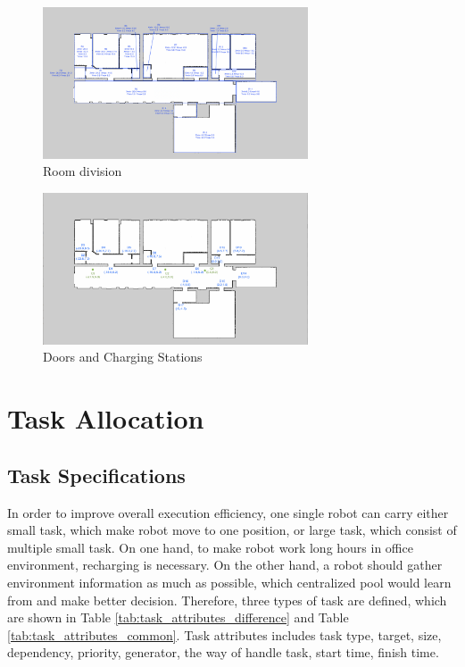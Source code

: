 \begin{figure}[htbp]
	\centering
	\includegraphics[width = 0.7\textwidth]{content/images/ch3/room_division.png}
	\caption{Room division}
	\label{fig:room_division}
\end{figure}

\begin{figure}[htbp]
	\centering
	\includegraphics[width = 0.7\textwidth]{content/images/ch3/positions_door_station.png}
	\caption{Doors and Charging Stations}
	\label{fig:positions_door_station}
\end{figure}

\section{Task Allocation}

\subsection{Task Specifications}
\label{sec:task_specifications}
In order to improve overall execution efficiency, one single robot can carry either small task, which make robot move to one position, or large task, which consist of multiple small task.
On one hand, to make robot work long hours in office environment, recharging is necessary. On the other hand, a robot should gather environment information as much as possible, which centralized pool would learn from and make better decision. 
Therefore, three types of task are defined, which are shown in Table \ref{tab:task_attributes_difference} and Table \ref{tab:task_attributes_common}.  Task attributes includes task type, target, size, dependency, priority, generator, the way of handle task, start time, finish time.

